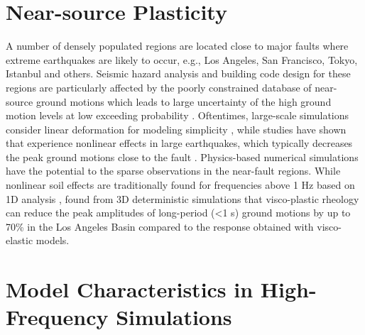 \section{Near-source Plasticity}

A number of densely populated regions are located close to major faults where extreme earthquakes are likely to occur, e.g., Los Angeles, San Francisco, Tokyo, Istanbul and others. Seismic hazard analysis and building code design for these regions are particularly affected by the poorly constrained database of near-source ground motions which leads to large uncertainty of the high ground motion levels at low exceeding probability .  Oftentimes, large-scale simulations consider linear deformation for modeling simplicity \citep{olsen20083d,molnar2014earthquake}, while studies have shown that experience nonlinear effects in large earthquakes, which typically decreases the peak ground motions close to the fault \citep{andrewsPhysicalLimitsGround2007,ma2008physical,duanSensitivityStudyPhysical2010,templetonDynamicRuptureBranched2010,dunhamEarthquakeRupturesStrongly2011}. Physics-based numerical simulations have the potential to the sparse observations in the near-fault regions. While nonlinear soil effects are traditionally found for frequencies above 1 Hz based on 1D analysis \citet{fieldNonlinearSiteResponse1998},  \citet{gravesBroadbandSimulationsSouthern2008} found from 3D deterministic simulations that visco-plastic rheology can reduce the peak amplitudes of long-period (<1 s) ground motions by up to 70\% in the Los Angeles Basin compared to the response obtained with visco-elastic models. 



\section{Model Characteristics in High-Frequency Simulations}


